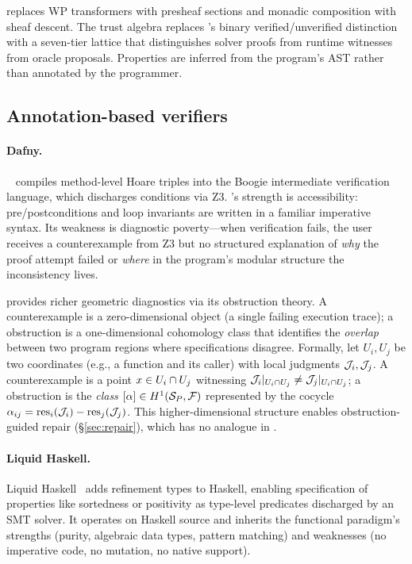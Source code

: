 \JuGeo{} replaces WP transformers with presheaf sections and monadic
composition with sheaf descent.  The trust algebra replaces \Fstar{}'s
binary verified/unverified distinction with a seven-tier lattice that
distinguishes solver proofs from runtime witnesses from oracle proposals.
Properties are inferred from the program's AST rather than annotated by
the programmer.

\subsection{Annotation-based verifiers}\label{sec:related:annotation}

\paragraph{Dafny.}
\Dafny{}~\cite{dafny} compiles method-level Hoare triples into the
Boogie intermediate verification language, which discharges conditions
via Z3.  \Dafny{}'s strength is accessibility: pre/postconditions and loop
invariants are written in a familiar imperative syntax.  Its weakness is
diagnostic poverty---when verification fails, the user receives a
counterexample from Z3 but no structured explanation of \emph{why} the
proof attempt failed or \emph{where} in the program's modular structure
the inconsistency lives.

\JuGeo{} provides richer geometric diagnostics via its obstruction theory.
A \Dafny{} counterexample is a zero-dimensional object (a single failing
execution trace); a \JuGeo{} obstruction is a one-dimensional cohomology
class that identifies the \emph{overlap} between two program regions where
specifications disagree.  Formally, let $U_i, U_j$ be two coordinates
(e.g., a function and its caller) with local judgments $\mathcal{J}_i, \mathcal{J}_j$.  A
\Dafny{} counterexample is a point $x \in U_i \cap U_j$ witnessing
$\mathcal{J}_i|_{U_i \cap U_j} \neq \mathcal{J}_j|_{U_i \cap U_j}$; a \JuGeo{}
obstruction is the \emph{class} $[\alpha] \in H^{1}(\mathcal{S}_P,
\mathcal{F})$ represented by the cocycle $\alpha_{ij} = \mathrm{res}_i(\mathcal{J}_i) -
\mathrm{res}_j(\mathcal{J}_j)$.  This higher-dimensional structure enables
obstruction-guided repair (\S\ref{sec:repair}), which has no analogue in
\Dafny{}.

\paragraph{Liquid Haskell.}
Liquid Haskell~\cite{liquidhaskell} adds refinement types to Haskell,
enabling specification of properties like sortedness or positivity as
type-level predicates discharged by an SMT solver.  It operates on Haskell
source and inherits the functional paradigm's strengths (purity,
algebraic data types, pattern matching) and weaknesses (no imperative
code, no mutation, no native \Python{} support).


